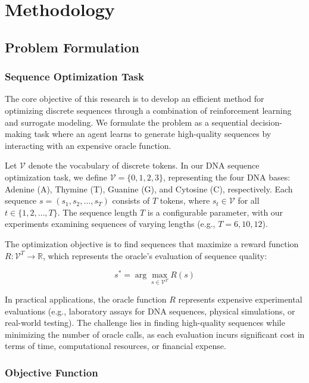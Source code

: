 \documentclass[conference]{IEEEtran}
\begin{document}
\section{Methodology}
\subsection{Problem Formulation}
\subsubsection{Sequence Optimization Task}

The core objective of this research is to develop an efficient method for optimizing discrete sequences through a combination of reinforcement learning and surrogate modeling. We formulate the problem as a sequential decision-making task where an agent learns to generate high-quality sequences by interacting with an expensive oracle function.

Let $\mathcal{V}$ denote the vocabulary of discrete tokens. In our DNA sequence optimization task, we define $\mathcal{V} = \{0, 1, 2, 3\}$, representing the four DNA bases: Adenine (A), Thymine (T), Guanine (G), and Cytosine (C), respectively. Each sequence $s = (s_1, s_2, \ldots, s_T)$ consists of $T$ tokens, where $s_t \in \mathcal{V}$ for all $t \in \{1, 2, \ldots, T\}$. The sequence length $T$ is a configurable parameter, with our experiments examining sequences of varying lengths (e.g., $T = 6, 10, 12$).

The optimization objective is to find sequences that maximize a reward function $R: \mathcal{V}^T \rightarrow \mathbb{R}$, which represents the oracle's evaluation of sequence quality:

\begin{equation}
s^* = \arg\max_{s \in \mathcal{V}^T} R(s)
\end{equation}

In practical applications, the oracle function $R$ represents expensive experimental evaluations (e.g., laboratory assays for DNA sequences, physical simulations, or real-world testing). The challenge lies in finding high-quality sequences while minimizing the number of oracle calls, as each evaluation incurs significant cost in terms of time, computational resources, or financial expense.


\subsubsection{Objective Function}
\end{document}
